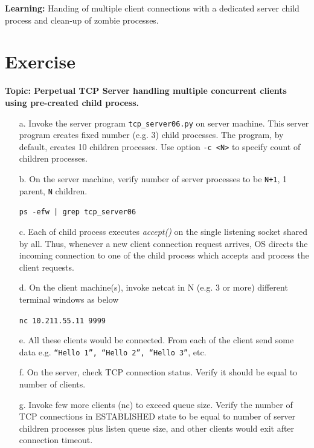 \begin{multicols}{2}
\begin{itemize}
\end{itemize}

\textbf{Learning:} Handing of multiple client connections with a dedicated server child process and clean-up of zombie processes.

\section*{Exercise \label{chap1-exe04}}

\textbf{Topic:  Perpetual TCP Server handling multiple concurrent clients using pre-created child process.}

\begin{itemize}

\item[a.] Invoke the server program \texttt{tcp\_server06.py} on server machine. This server program creates fixed number (e.g. 3) child processes. The program, by default, creates 10 children processes. Use option \texttt{-c <N>} to specify count of children processes.

\item[b.] On the server machine, verify number of server processes to be \texttt{N+1}, 1 parent, \texttt{N} children.

\texttt{ps -efw | grep tcp\_server06}

\item[c.] Each of child process executes \textit{accept()} on the single listening socket shared by all. Thus, whenever a new client connection request arrives, OS directs the incoming connection to one of the child process which accepts and process the client requests.

\item[d.] On the client machine(s), invoke netcat in N (e.g. 3 or more) different terminal windows as below

\texttt{nc 10.211.55.11 9999}

\item[e.] All these clients would be connected. From each of the client send some data e.g. \texttt{“Hello 1”, “Hello 2”, “Hello 3”}, etc.

\item[f.] On the server, check TCP connection status.  Verify it should be equal to number of clients.

\item[g.] Invoke few more clients (nc) to exceed queue size. Verify the number of TCP connections in ESTABLISHED state to be equal to number of server children processes plus listen queue size, and other clients would exit after connection timeout.
\end{itemize}


\end{multicols}
